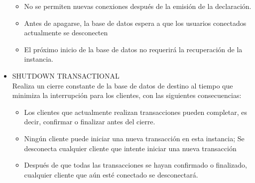 \begin{itemize}
		\begin{itemize}
			\item No se permiten nuevas conexiones después de la emisión de la declaración.
			\item Antes de apagarse, la base de datos espera a que los usuarios conectados actualmente se desconecten
			\item El próximo inicio de la base de datos no requerirá la recuperación de la instancia.
			
		\end{itemize}


\item SHUTDOWN TRANSACTIONAL
	\\Realiza un cierre constante de la base de datos de destino al tiempo que minimiza la interrupción para los clientes, con las siguientes consecuencias:
		
		\begin{itemize}
			\item Los clientes que actualmente realizan transacciones pueden completar, es decir, confirmar o finalizar antes del cierre.
			\item Ningún cliente puede iniciar una nueva transacción en esta instancia; Se desconecta cualquier cliente que intente iniciar una nueva transacción
			\item Después de que todas las transacciones se hayan confirmado o finalizado, cualquier cliente que aún esté conectado se desconectará.
			
		\end{itemize}




\end{itemize} 